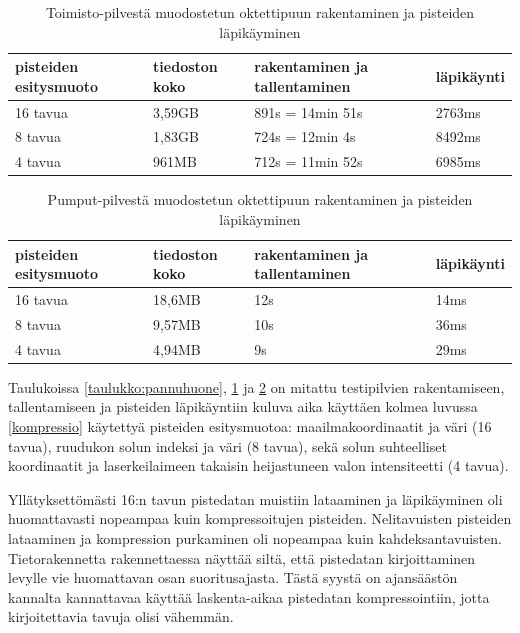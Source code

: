 \begin{table}[h]
    \begin{tabular}{|l|l|l|l|}
    \hline
    \textbf{pisteiden esitysmuoto} & \textbf{tiedoston koko} & \textbf{rakentaminen ja tallentaminen} & \textbf{läpikäynti} \\ \hline
    16 tavua & 3,59GB              & 891s = 14min 51s              & 2763ms     \\
    8 tavua  & 1,83GB              & 724s = 12min 4s               & 8492ms     \\
    4 tavua & 961MB               & 712s = 11min 52s              & 6985ms     \\ \hline
    \end{tabular}
    \caption{Toimisto-pilvestä muodostetun oktettipuun rakentaminen ja pisteiden läpikäyminen}
    \label{taulukko:toimisto}
\end{table}

\begin{table}[h]
    \begin{tabular}{|l|l|l|l|}
    \hline
    \textbf{pisteiden esitysmuoto} & \textbf{tiedoston koko} & \textbf{rakentaminen ja tallentaminen} & \textbf{läpikäynti} \\ \hline
    16 tavua       & 18,6MB              & 12s                           & 14ms       \\ \hline
    8 tavua      & 9,57MB              & 10s                           & 36ms       \\ \hline
    4 tavua      & 4,94MB              & 9s                            & 29ms       \\ \hline
    \end{tabular}
    \caption{Pumput-pilvestä muodostetun oktettipuun rakentaminen ja pisteiden läpikäyminen}
    \label{taulukko:pumput}
\end{table}

Taulukoissa \ref{taulukko:pannuhuone}, \ref{taulukko:toimisto} ja \ref{taulukko:pumput} on mitattu testipilvien rakentamiseen, tallentamiseen ja pisteiden läpikäyntiin kuluva aika käyttäen kolmea luvussa \ref{kompressio} käytettyä pisteiden esitysmuotoa: maailmakoordinaatit ja väri (16 tavua), ruudukon solun indeksi ja väri (8 tavua), sekä solun suhteelliset koordinaatit ja laserkeilaimeen takaisin heijastuneen valon intensiteetti (4 tavua). 

Yllätyksettömästi 16:n tavun pistedatan muistiin lataaminen ja läpikäyminen oli huomattavasti nopeampaa kuin kompressoitujen pisteiden. Nelitavuisten pisteiden lataaminen ja kompression purkaminen oli nopeampaa kuin kahdeksantavuisten. Tietorakennetta rakennettaessa näyttää siltä, että pistedatan kirjoittaminen levylle vie huomattavan osan suoritusajasta. Tästä syystä on ajansäästön kannalta kannattavaa käyttää laskenta-aikaa pistedatan kompressointiin, jotta kirjoitettavia tavuja olisi vähemmän. 


